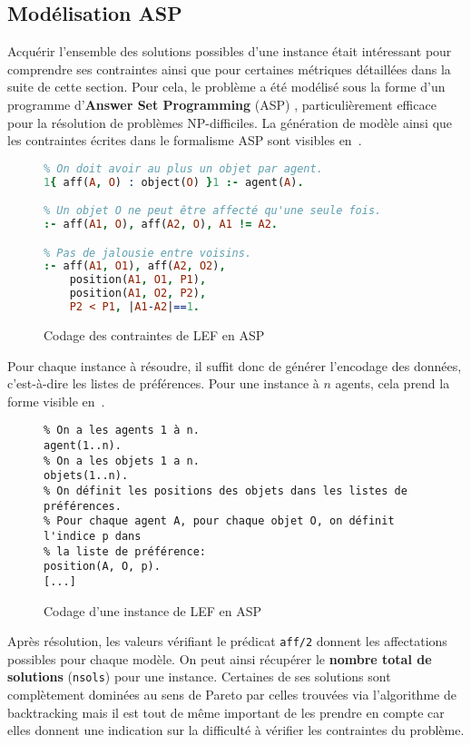 \documentclass[../main.tex]{subfiles}
\begin{document}
	\subsection{Modélisation ASP}
	Acquérir l'ensemble des solutions possibles d'une instance était intéressant pour comprendre ses contraintes ainsi que pour certaines métriques détaillées dans la suite de cette section. Pour cela, le problème a été modélisé sous la forme d'un programme d'\textbf{Answer Set Programming} (ASP) \cite{asp}, particulièrement efficace pour la résolution de problèmes NP-difficiles. La génération de modèle ainsi que les contraintes écrites dans le formalisme ASP sont visibles en~.
\begin{figure}[ht!]
\begin{lstlisting}[language=Prolog]
% Génération:
% On doit avoir au plus un objet par agent.
1{ aff(A, O) : object(O) }1 :- agent(A).

% Un objet O ne peut être affecté qu'une seule fois.
:- aff(A1, O), aff(A2, O), A1 != A2.

% Pas de jalousie entre voisins.
:- aff(A1, O1), aff(A2, O2), 
	position(A1, O1, P1), 
	position(A1, O2, P2), 
	P2 < P1, |A1-A2|==1.
\end{lstlisting}
\caption{Codage des contraintes de LEF en ASP}
\label{asp-pbm}
\end{figure}
Pour chaque instance à résoudre, il suffit donc de générer l'encodage des données, c'est-à-dire les listes de préférences. Pour une instance à $n$ agents, cela prend la forme visible en~.
\begin{figure}[ht!]
\begin{lstlisting}
% On a les agents 1 à n.
agent(1..n).
% On a les objets 1 a n.
objets(1..n).
% On définit les positions des objets dans les listes de préférences.
% Pour chaque agent A, pour chaque objet O, on définit l'indice p dans
% la liste de préférence:
position(A, O, p).
[...]
\end{lstlisting}
\caption{Codage d'une instance de LEF en ASP}
\label{asp-inst}
\end{figure}
Après résolution, les valeurs vérifiant le prédicat \texttt{aff/2} donnent les affectations possibles pour chaque modèle. On peut ainsi récupérer le \textbf{nombre total de solutions} (\texttt{nsols}) pour une instance. Certaines de ses solutions sont complètement dominées au sens de Pareto par celles trouvées via l'algorithme de backtracking mais il est tout de même important de les prendre en compte car elles donnent une indication sur la difficulté à vérifier les contraintes du problème.
\end{document}
